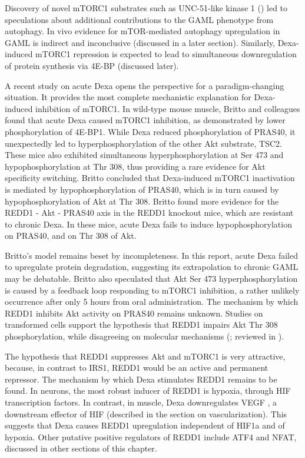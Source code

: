 \documentclass[12pt,english]{report}\usepackage[]{graphicx}\usepackage[]{color}
\begin{document}
Discovery of novel mTORC1 substrates such as UNC-51-like kinase 1
()\citep{hosokawa2009nutrient-dependent}
led to speculations about additional contributions to the GAML phenotype
from autophagy. In vivo evidence for mTOR-mediated autophagy upregulation
in GAML is indirect and inconclusive (discussed in a later section).
Similarly, Dexa-induced mTORC1 repression is expected to lead to simultaneous
downregulation of protein synthesis via 4E-BP (discussed later). 

A recent study on acute Dexa\citep{britto2014redd1} opens the perspective
for a paradigm-changing situation. It provides the most complete mechanistic
explanation for Dexa-induced inhibition of mTORC1. In wild-type mouse
muscle, Britto and colleagues found that acute Dexa caused mTORC1
inhibition, as demonstrated by lower phosphorylation of 4E-BP1. While
Dexa reduced phosphorylation of PRAS40, it unexpectedly led to hyperphosphorylation
of the other Akt substrate, TSC2. These mice also exhibited simultaneous
hyperphosphorylation at Ser 473 and hypophosphorylation at Thr 308,
thus providing a rare evidence for Akt specificity switching. Britto
concluded that Dexa-induced mTORC1 inactivation is mediated by hypophosphorylation
of PRAS40, which is in turn caused by hypophosphorylation of Akt at
Thr 308. Britto found more evidence for the REDD1 - Akt - PRAS40 axis
in the REDD1 knockout mice, which are resistant to chronic Dexa. In
these mice, acute Dexa fails to induce hypophosphorylation on PRAS40,
and on Thr 308 of Akt.

Britto's model remains beset by incompleteness. In this report, acute
Dexa failed to upregulate protein degradation, suggesting its extrapolation
to chronic GAML may be debatable. Britto also speculated that Akt
Ser 473 hyperphosphorylation is caused by a feedback loop responding
to mTORC1 inhibition, a rather unlikely occurrence after only 5 hours
from oral administration. The mechanism by which REDD1 inhibits Akt
activity on PRAS40 remains unknown. Studies on transformed cells support
the hypothesis that REDD1 impairs Akt Thr 308 phosphorylation, while
disagreeing on molecular mechanisms (\citep{dennis2014redd1}; reviewed
in \citep{canal2014rtp801/redd1:}).

The hypothesis that REDD1 suppresses Akt and mTORC1 is very attractive,
because, in contrast to IRS1, REDD1 would be an active and permanent
repressor. The mechanism by which Dexa stimulates REDD1 remains to
be found. In neurons, the most robust inducer of REDD1 is hypoxia,
through HIF transcription factors\citep{canal2014rtp801/redd1:}.
In contrast, in muscle, Dexa downregulates VEGF \citep{barel2010exercise},
a downstream effector of HIF (described in the section on vascularization).
This suggests that Dexa causes REDD1 upregulation independent of HIF1a
and of hypoxia. Other putative positive regulators of REDD1 include
ATF4 and NFAT, discussed in other sections of this chapter.
\end{document}

